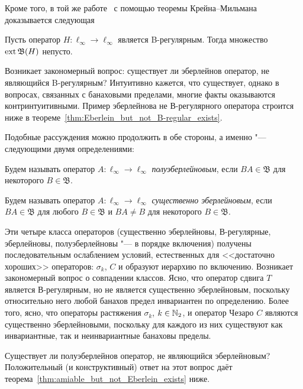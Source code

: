 Кроме того, в той же работе~\cite{alekhno2018invariant}
с помощью теоремы Крейна--Мильмана~\cite[теорема  9.14]{aliprantis2006positive}
доказывается следующая
\begin{lemma}
	Пусть оператор $H:\ell_\infty\to\ell_\infty$ является B-регулярным.
	Тогда множество $\operatorname{ext}\mathfrak{B}(H)$ непусто.
\end{lemma}

Возникает закономерный вопрос: существует ли эберлейнов оператор, не являющийся B-регулярным?
Интуитивно кажется, что существует, однако в вопросах, связанных с банаховыми пределами,
многие факты оказываются контринтуитивными.
Пример эберлейнова не В-регулярного оператора строится ниже
в теореме~\ref{thm:Eberlein_but_not_B-regular_exists}.

Подобные рассуждения можно продолжить в обе стороны, а именно "--- следующими двумя определениями:

\begin{definition}
	Будем называть оператор $A:\ell_\infty \to \ell_\infty$ \emph{полуэберлейновым}, если $BA\in\mathfrak B$ для некоторого $B\in\mathfrak B$.
\end{definition}

\begin{definition}
	Будем называть оператор $A:\ell_\infty \to \ell_\infty$ \emph{существенно эберлейновым}, если $BA\in\mathfrak B$ для любого $B\in\mathfrak B$ и $BA\ne B$ для некоторого $B\in\mathfrak B$.
\end{definition}

Эти четыре класса операторов (существенно эберлейновы, В-регулярные, эберлейновы, полуэберлейновы "--- в порядке включения)
получены последовательным ослаблением условий, естественных для <<достаточно хороших>> операторов:
$\sigma_k$, $C$
и образуют иерархию по включению.
Возникает закономерный вопрос о совпадении классов.
Ясно, что оператор сдвига $T$ является В-регулярным, но не является существенно эберлейновым, поскольку относительно него любой банахов предел инвариантен по определению.
Более того, ясно, что операторы растяжения $\sigma_k$, $k\in\mathbb{N}_2$, и оператор Чезаро $C$ являются существенно эберлейновыми,
поскольку для каждого из них существуют как инвариантные, так и неинвариантные банаховы пределы.

Существует ли полуэберлейнов оператор, не являющийся эберлейновым?
Положительный (и конструктивный) ответ на этот вопрос даёт теорема~\ref{thm:amiable_but_not_Eberlein_exists} ниже.



